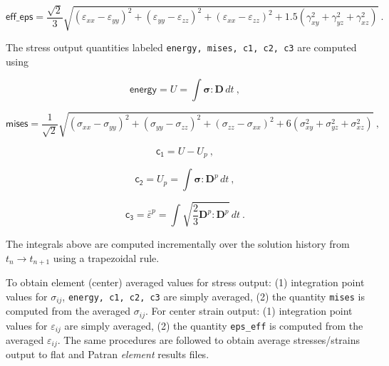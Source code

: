 \documentclass[11pt]{report}
\numberwithin{equation}{section}
\newcommand{\ttt} {\texttt}  %
\newcommand{\hv} {\mathsf}   %
\newcommand{\ti}{\emph}
\newcommand{\veps}{\varepsilon}
\newcommand{\noi}{\noindent}
\begin{document}
\small
\begin{equation} \label{eq:eps-eff-output}
\hv{eff\_eps} =\frac{\sqrt{2}}{3} \sqrt{ (\veps_{xx} - \veps_{yy})^2+
(\veps_{yy} - \veps_{zz})^2 +(\veps_{xx }- \veps_{zz})^2
+ 1.5 ( \gamma_{xy}^2 +  \gamma_{yz}^2 + \gamma_{xz}^2)}\ .
\end{equation}
\normalsize

The stress output quantities labeled \ttt{energy, mises, c1, c2, c3} are computed using

\small
\begin{equation} \label{eq:work-output}
      \hv{energy} =U =\int \bm{\sigma}:\mathbf{D}\,dt\ ,
\end{equation}

\begin{equation} \label{eq:mises-output}
\hv{mises} = \frac{1}{\sqrt{2}} \sqrt{(\sigma_{xx} - \sigma_{yy})^2 +
 (\sigma_{yy} - \sigma_{zz})^2 + (\sigma_{zz} - \sigma_{xx})^2 + 
 6(\sigma_{xy}^2 + \sigma_{yz}^2 + \sigma_{xz}^2)} \ ,
\end{equation}

\begin{equation} \label{eq:output-elastic-work}
      \hv{c_1} = U - U_p \ ,
\end{equation}

\begin{equation} \label{eq:output-plastic-work}
   \hv{c_2}  =U_p=\int \bm{\sigma}:\mathbf{D}^{p}\,dt\ ,
\end{equation}


\begin{equation} \label{eq:eps}
    \hv{c_3} =   \bar{\varepsilon}^{p}=\int\sqrt{{\textstyle\frac{2}{3}}\mathbf{D}^{p}:\mathbf{D}^{p}}\,dt\ .
\end{equation}
\normalsize

\noi The integrals above are computed incrementally over the solution
history from $t_n \rightarrow t_{n+1}$ using a trapezoidal rule.

To obtain element (center) averaged values for stress output: (1) integration point values for
$\sigma_{ij}$, \ttt{energy, c1, c2, c3} are simply averaged, (2) the quantity \ttt{mises} is
computed from the averaged $\sigma_{ij}$. For center strain output: (1) integration point values for
$\veps_{ij}$ are simply averaged, (2) the quantity \ttt{eps\_eff} is
computed from the averaged $\veps_{ij}$.  The same procedures are followed to obtain
average stresses/strains output to flat and Patran \ti{element} results files.
\end{document}
